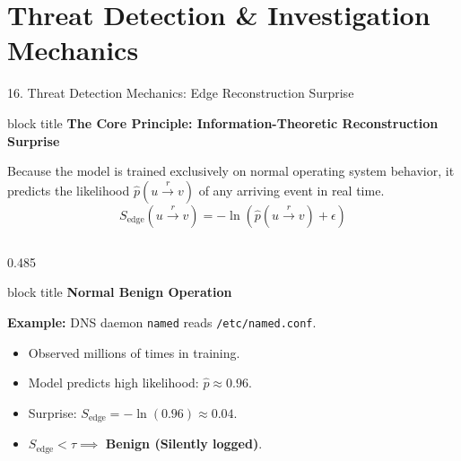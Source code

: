 \documentclass[aspectratio=169,10pt]{beamer}
\begin{document}
\section{Threat Detection \& Investigation Mechanics}

\begin{frame}[t]{16. Threat Detection Mechanics: Edge Reconstruction Surprise}
\vspace{-0.2em}
\begin{beamercolorbox}[rounded=true,shadow=false,sep=0.30em,wd=\textwidth]{block title}
\textbf{\scriptsize The Core Principle: Information-Theoretic Reconstruction Surprise}
\end{beamercolorbox}
\vspace{0.10em}
{\fontsize{7.2pt}{10.2pt}\selectfont
Because the model is trained exclusively on normal operating system behavior, it predicts the likelihood $\hat{p}(u \xrightarrow{r} v)$ of any arriving event in real time.
\[
S_{\text{edge}}(u \xrightarrow{r} v) = -\ln\left(\hat{p}(u \xrightarrow{r} v) + \epsilon\right)
\]
}

\vspace{0.20em}

\begin{columns}[T]
\begin{column}{0.485\textwidth}
\begin{beamercolorbox}[rounded=true,shadow=false,sep=0.28em,wd=\linewidth]{block title}
\textbf{\scriptsize Normal Benign Operation}
\end{beamercolorbox}
\vspace{0.08em}
{\fontsize{6.8pt}{9.2pt}\selectfont
\textbf{Example:} DNS daemon \texttt{named} reads \texttt{/etc/named.conf}.\\
\begin{itemize}\itemsep0.15em
  \item Observed millions of times in training.
  \item Model predicts high likelihood: $\hat{p} \approx 0.96$.
  \item Surprise: $S_{\text{edge}} = -\ln(0.96) \approx \mathbf{0.04}$.
  \item $S_{\text{edge}} < \tau \implies$ \textbf{Benign (Silently logged)}.
\end{itemize}
}
\end{column}


\end{columns}
\end{frame}
\end{document}
